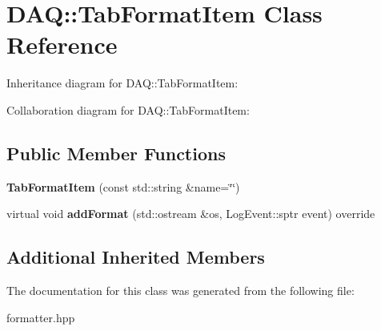 \hypertarget{classDAQ_1_1TabFormatItem}{}\section{D\+AQ\+:\+:Tab\+Format\+Item Class Reference}
\label{classDAQ_1_1TabFormatItem}


Inheritance diagram for D\+AQ\+:\+:Tab\+Format\+Item\+:


Collaboration diagram for D\+AQ\+:\+:Tab\+Format\+Item\+:
\subsection*{Public Member Functions}
\begin{DoxyCompactItemize}
\item 
\mbox{\label{classDAQ_1_1TabFormatItem_ac8bd7fde6062bf8020587fcdebcabebc}} 
{\bfseries Tab\+Format\+Item} (const std\+::string \&name=\char`\"{}\char`\"{})
\item 
\mbox{\label{classDAQ_1_1TabFormatItem_a7f2a2bae3986c72b803bf1ac908a27cd}} 
virtual void {\bfseries add\+Format} (std\+::ostream \&os, Log\+Event\+::sptr event) override
\end{DoxyCompactItemize}
\subsection*{Additional Inherited Members}


The documentation for this class was generated from the following file\+:\begin{DoxyCompactItemize}
\item 
formatter.\+hpp\end{DoxyCompactItemize}
